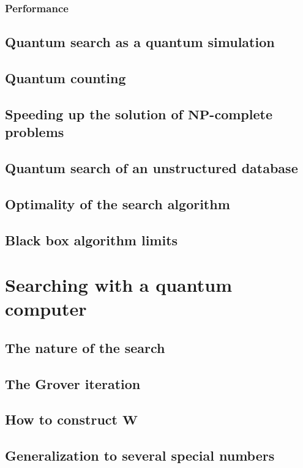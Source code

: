 \documentclass{book}
\theoremstyle{definition}
\begin{document}
\subsubsection{Performance}
\subsection{Quantum search as a quantum simulation}
\subsection{Quantum counting}
\subsection{Speeding up the solution of $\mathbf{NP}$-complete problems}
\subsection{Quantum search of an unstructured database}
\subsection{Optimality of the search algorithm}
\subsection{Black box algorithm limits}








\newpage

\section{Searching with a quantum computer}

\subsection{The nature of the search}
\subsection{The Grover iteration}
\subsection{How to construct $\mathbf{W}$}
\subsection{Generalization to several special numbers}
\end{document}
